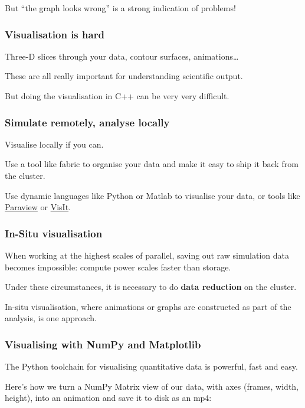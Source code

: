 But ``the graph looks wrong'' is a strong indication of problems!

\subsubsection{Visualisation is hard}\label{visualisation-is-hard}

Three-D slices through your data, contour surfaces, animations\ldots{}

These are all really important for understanding scientific output.

But doing the visualisation in C++ can be very very difficult.

\subsubsection{Simulate remotely, analyse
locally}\label{simulate-remotely-analyse-locally}

Visualise locally if you can.

Use a tool like fabric to organise your data and make it easy to ship it
back from the cluster.

Use dynamic languages like Python or Matlab to visualise your data, or
tools like \href{http://www.paraview.org}{Paraview} or
\href{https://wci.llnl.gov/simulation/computer-codes/visit/}{VisIt}.

\subsubsection{In-Situ visualisation}\label{in-situ-visualisation}

When working at the highest scales of parallel, saving out raw
simulation data becomes impossible: compute power scales faster than
storage.

Under these circumstances, it is necessary to do \textbf{data reduction}
on the cluster.

In-situ visualisation, where animations or graphs are constructed as
part of the analysis, is one approach.

\subsubsection{Visualising with NumPy and
Matplotlib}\label{visualising-with-numpy-and-matplotlib}

The Python toolchain for visualising quantitative data is powerful, fast
and easy.

Here's how we turn a NumPy Matrix view of our data, with axes (frames,
width, height), into an animation and save it to disk as an mp4:


